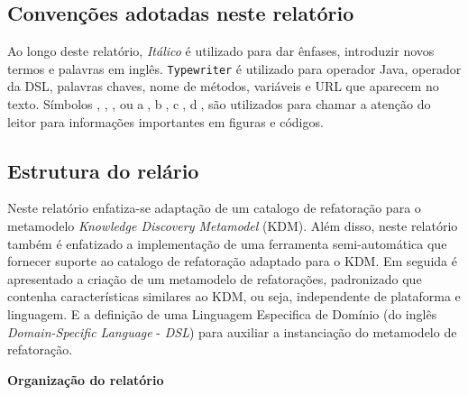 \subsection{Convenções adotadas neste relatório}

Ao longo deste relatório, \textit{Itálico} é utilizado para dar ênfases, introduzir novos termos e palavras em inglês. \texttt{Typewriter} é utilizado para operador Java, operador da DSL, palavras chaves, nome de métodos, variáveis e URL que aparecem no texto. Símbolos , , ,  ou \textcircled{a}, \textcircled{b}, \textcircled{c}, \textcircled{d}, são utilizados para chamar a atenção do leitor para informações importantes em figuras e códigos.

\subsection{Estrutura do relário}

Neste relatório enfatiza-se adaptação de um catalogo de refatoração para o metamodelo \textit{Knowledge Discovery Metamodel} (KDM). Além disso, neste relatório também é enfatizado a implementação de uma ferramenta semi-automática que fornecer suporte ao catalogo de refatoração adaptado para o KDM. Em seguida é apresentado a criação de um metamodelo de refatorações, padronizado que contenha características similares ao KDM, ou seja, independente de plataforma e linguagem. E a definição de uma Linguagem Especifica de Domínio (do inglês \textit{Domain-Specific Language} - \textit{DSL}) para auxiliar a instanciação do metamodelo de refatoração.

\textbf{Organização do relatório}
